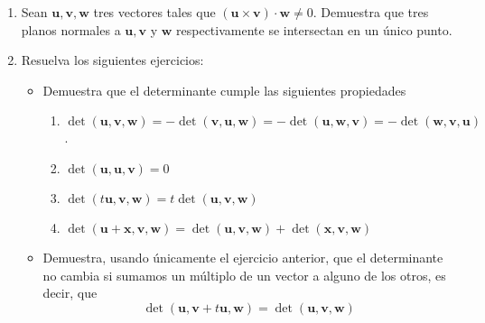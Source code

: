 \documentclass[a4paper, 12pt]{article}
\begin{document}
\begin{enumerate}
\item Sean $\mathbf{u}, \mathbf{v}, \mathbf{w}$ tres vectores tales que $(\mathbf{u} \times \mathbf{v}) \cdot \mathbf{w} \neq 0$. Demuestra que tres planos normales a $\mathbf{u}, \mathbf{v}$ y $\mathbf{w}$ respectivamente se intersectan en un único punto.

\item Resuelva los siguientes ejercicios:
\begin{itemize}
\item Demuestra que el determinante cumple las siguientes propiedades
\begin{enumerate}
  \item $\det(\mathbf{u}, \mathbf{v}, \mathbf{w})=-\det(\mathbf{v}, \mathbf{u}, \mathbf{w})=-\det(\mathbf{u}, \mathbf{w}, \mathbf{v})=-\det(\mathbf{w}, \mathbf{v}, \mathbf{u})$. 
  \item $\det(\mathbf{u}, \mathbf{u}, \mathbf{v})=0$
  \item $\det( t \mathbf{u}, \mathbf{v}, \mathbf{w})= t \det(\mathbf{u}, \mathbf{v}, \mathbf{w})$
  \item $\det(\mathbf{u}+\mathbf{x}, \mathbf{v}, \mathbf{w})=\det(\mathbf{u}, \mathbf{v}, \mathbf{w})+\det(\mathbf{x}, \mathbf{v}, \mathbf{w})$
\end{enumerate}

\item Demuestra, usando únicamente el ejercicio anterior, que el determinante no cambia si sumamos un múltiplo de un vector a alguno de los otros, es decir, que
$$
\det(\mathbf{u}, \mathbf{v}+ t \mathbf{u}, \mathbf{w})=\det(\mathbf{u}, \mathbf{v}, \mathbf{w})
$$
\end{itemize}
\end{enumerate} 
\end{document}
